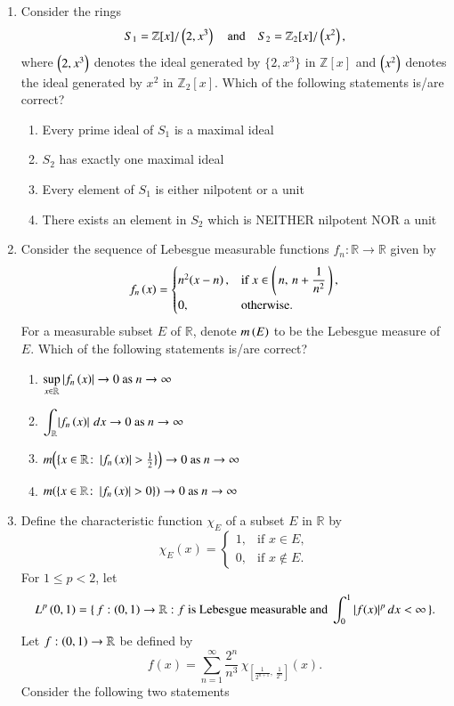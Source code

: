 \documentclass[journal,12pt,onecolumn]{IEEEtran}
\theoremstyle{remark}
\begin{document}
\begin{enumerate}[start=1, label=Q.\arabic*]
\hfill{}

\item Consider the rings
\[
S_{1}=\mathbb{Z}[x]/\left(2,x^{3}\right)
\quad\text{and}\quad
S_{2}=\mathbb{Z}_{2}[x]/\left(x^{2}\right),
\]
where $\left(2,x^{3}\right)$ denotes the ideal generated by $\{2,x^{3}\}$ in $\mathbb{Z}[x]$ and $\left(x^{2}\right)$ denotes the ideal generated by $x^{2}$ in $\mathbb{Z}_{2}[x]$. Which of the following statements is/are correct?

\begin{enumerate}
\item Every prime ideal of $S_{1}$ is a maximal ideal
\item $S_{2}$ has exactly one maximal ideal
\item Every element of $S_{1}$ is either nilpotent or a unit
\item There exists an element in $S_{2}$ which is NEITHER nilpotent NOR a unit
\end{enumerate}

\hfill{}


\item Consider the sequence of Lebesgue measurable functions $f_{n}\colon\mathbb{R}\to\mathbb{R}$ given by
\[
f_{n}\left(x\right)=
\begin{cases}
n^{2}\!\left(x-n\right), & \text{if } x\in\left(\,n,\,n+\dfrac{1}{n^{2}}\,\right),\\[6pt]
0, & \text{otherwise}.
\end{cases}
\]
For a measurable subset $E$ of $\mathbb{R}$, denote $m\left(E\right)$ to be the Lebesgue measure of $E$. Which of the following statements is/are correct?

\begin{enumerate}
\item $\displaystyle \sup_{x\in\mathbb{R}}\left\vert f_{n}\left(x\right)\right\vert\to 0 \text{ as } n\to\infty$
\item $\displaystyle \int_{\mathbb{R}}\!\left\vert f_{n}\left(x\right)\right\vert\,dx\to 0 \text{ as } n\to\infty$
\item $\displaystyle m\!\left(\{x\in\mathbb{R}\colon \left\vert f_{n}\left(x\right)\right\vert>\tfrac{1}{2}\}\right)\to 0 \text{ as } n\to\infty$
\item $\displaystyle m\!\left(\{x\in\mathbb{R}\colon \left\vert f_{n}\left(x\right)\right\vert>0\}\right)\to 0 \text{ as } n\to\infty$
\end{enumerate}

\hfill{}


\item Define the characteristic function $\chi_{E}$ of a subset $E$ in $\mathbb{R}$ by
\[
\chi_{E}(x)=
\begin{cases}
1, & \text{if } x\in E,\\
0, & \text{if } x\notin E.
\end{cases}
\]
For $1\le p<2$, let
\[
L^{p}\left(0,1\right)=\{\, f: \left(0,1\right)\to \mathbb{R} : f \text{ is Lebesgue measurable and } \int_{0}^{1}\left\vert f(x)\right\vert^{p}dx<\infty \,\}.
\]
Let $f: \left(0,1\right)\to \mathbb{R}$ be defined by
\[
f(x)=\sum_{n=1}^{\infty}\frac{2^{n}}{n^{3}}\,
\chi_{\left[\frac{1}{2^{n+1}},\,\frac{1}{2^{n}}\right]}(x).
\]
Consider the following two statements\brak{:}


\end{enumerate}
\end{document}
